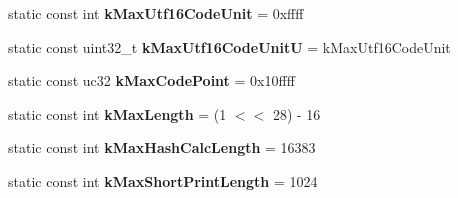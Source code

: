 \begin{DoxyCompactItemize}
\item 
static const int {\bfseries k\+Max\+Utf16\+Code\+Unit} = 0xffff\hypertarget{classv8_1_1internal_1_1_string_a9719cdc31445a57dce92e4d4805b08bf}{}\label{classv8_1_1internal_1_1_string_a9719cdc31445a57dce92e4d4805b08bf}

\item 
static const uint32\+\_\+t {\bfseries k\+Max\+Utf16\+Code\+UnitU} = k\+Max\+Utf16\+Code\+Unit\hypertarget{classv8_1_1internal_1_1_string_a81ef90e12316d65782d437f8dca8b1d5}{}\label{classv8_1_1internal_1_1_string_a81ef90e12316d65782d437f8dca8b1d5}

\item 
static const uc32 {\bfseries k\+Max\+Code\+Point} = 0x10ffff\hypertarget{classv8_1_1internal_1_1_string_a8b91cf9f45a65b72b2bbd1973ce428ce}{}\label{classv8_1_1internal_1_1_string_a8b91cf9f45a65b72b2bbd1973ce428ce}

\item 
static const int {\bfseries k\+Max\+Length} = (1 $<$$<$ 28) -\/ 16\hypertarget{classv8_1_1internal_1_1_string_a52630f40be32d591ee88ec7670dd45d5}{}\label{classv8_1_1internal_1_1_string_a52630f40be32d591ee88ec7670dd45d5}

\item 
static const int {\bfseries k\+Max\+Hash\+Calc\+Length} = 16383\hypertarget{classv8_1_1internal_1_1_string_a51b6ca2dcf6d8bdb10c510d580e0e3f4}{}\label{classv8_1_1internal_1_1_string_a51b6ca2dcf6d8bdb10c510d580e0e3f4}

\item 
static const int {\bfseries k\+Max\+Short\+Print\+Length} = 1024\hypertarget{classv8_1_1internal_1_1_string_a615a212c4e682f2aef5f3c45faaba643}{}\label{classv8_1_1internal_1_1_string_a615a212c4e682f2aef5f3c45faaba643}

\end{DoxyCompactItemize}
